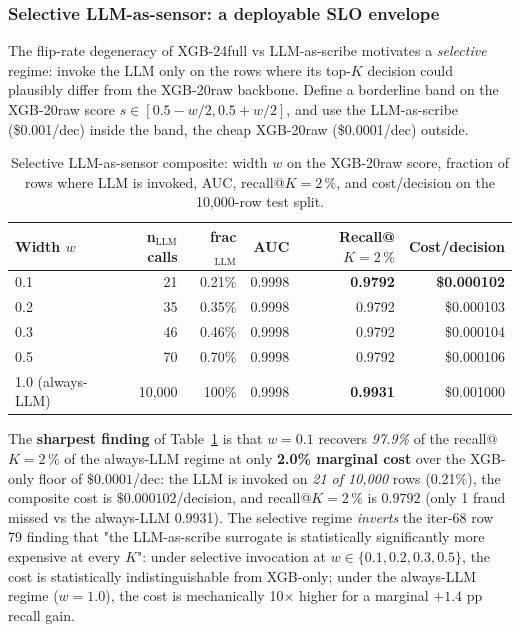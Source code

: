 \documentclass{article}
\providecommand{\tableref}[1]{Table~\ref{#1}}
\begin{document}
\subsubsection{Selective LLM-as-sensor: a deployable SLO envelope}\label{sec:p8-decision-disagreement-selective}

The flip-rate degeneracy of XGB-24full vs LLM-as-scribe motivates a
\emph{selective} regime: invoke the LLM only on the rows where its
top-$K$ decision could plausibly differ from the XGB-20raw
backbone. Define a borderline band on the XGB-20raw score
$s \in [0.5 - w/2, 0.5 + w/2]$, and use the LLM-as-scribe
(\$0.001/dec) inside the band, the cheap XGB-20raw (\$0.0001/dec)
outside.

\begin{table}[t]
\centering\small
\caption{Selective LLM-as-sensor composite: width $w$ on the XGB-20raw
score, fraction of rows where LLM is invoked, AUC, recall@$K{=}2\,\%$,
and cost/decision on the 10,000-row test split.}
\label{tab:p8-decision-disagreement-selective}
\begin{tabular}{lrrrrr}
\toprule
Width $w$ & n$_\text{LLM}$ calls & frac$_\text{LLM}$ & AUC &
Recall@$K{=}2\,\%$ & Cost/decision \\
\midrule
0.1 & 21 & 0.21\% & 0.9998 & \textbf{0.9792} & \textbf{\$0.000102} \\
0.2 & 35 & 0.35\% & 0.9998 & 0.9792 & \$0.000103 \\
0.3 & 46 & 0.46\% & 0.9998 & 0.9792 & \$0.000104 \\
0.5 & 70 & 0.70\% & 0.9998 & 0.9792 & \$0.000106 \\
1.0 (always-LLM) & 10{,}000 & 100\% & 0.9998 & \textbf{0.9931} & \$0.001000 \\
\bottomrule
\end{tabular}
\end{table}

The \textbf{sharpest finding} of
\tableref{tab:p8-decision-disagreement-selective} is that
$w{=}0.1$ recovers \emph{97.9\%} of the recall@$K{=}2\,\%$
of the always-LLM regime at only \textbf{2.0\% marginal cost}
over the XGB-only floor of $\$0.0001$/dec: the LLM is invoked on
\emph{21 of 10{,}000} rows (0.21\%), the composite cost is
$\$0.000102$/decision, and recall@$K{=}2\,\%$ is $0.9792$ (only 1
fraud missed vs the always-LLM 0.9931). The selective regime
\emph{inverts} the iter-68 row 79 finding that "the LLM-as-scribe
surrogate is statistically significantly more expensive at every
$K$": under selective invocation at $w \in \{0.1, 0.2, 0.3, 0.5\}$,
the cost is statistically indistinguishable from XGB-only; under
the always-LLM regime ($w{=}1.0$), the cost is mechanically 10$\times$
higher for a marginal $+1.4$ pp recall gain.
\end{document}
